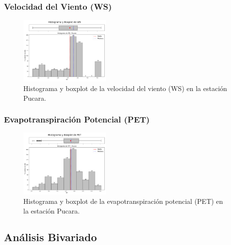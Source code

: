 \subsubsection*{Velocidad del Viento (WS)}
\begin{figure}[H]
\centering
\includegraphics[width=0.4\textwidth]{resultados/por_estacion_meteorologica/Pucara/WS_histograma.png}
\caption{Histograma y boxplot de la velocidad del viento (WS) en la estación Pucara.}
\label{fig:pucara_WS}
\end{figure}

\subsubsection*{Evapotranspiración Potencial (PET)}
\begin{figure}[H]
\centering
\includegraphics[width=0.4\textwidth]{resultados/por_estacion_meteorologica/Pucara/PET_histograma.png}
\caption{Histograma y boxplot de la evapotranspiración potencial (PET) en la estación Pucara.}
\label{fig:pucara_PET}
\end{figure}

\subsection{Análisis Bivariado}

